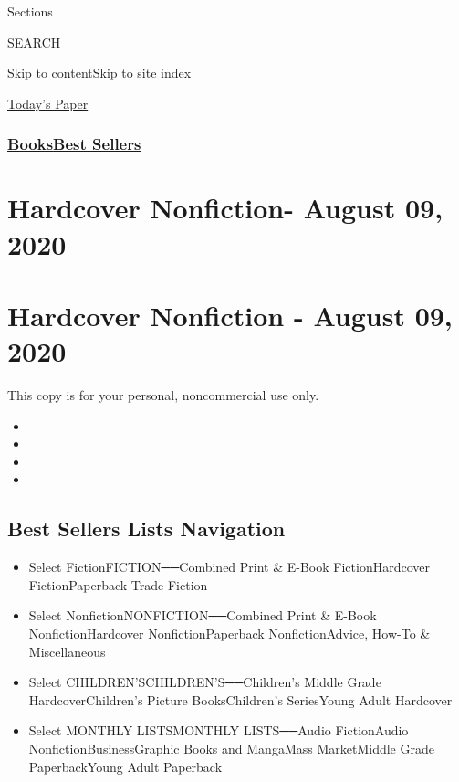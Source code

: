 Sections

SEARCH

\protect\hyperlink{site-content}{Skip to
content}\protect\hyperlink{site-index}{Skip to site index}

\href{https://myaccount.nytimes3xbfgragh.onion/auth/login?response_type=cookie\&client_id=vi}{}

\href{https://www.nytimes3xbfgragh.onion/section/todayspaper}{Today's
Paper}

\hypertarget{booksbest-sellers}{%
\subsubsection{\texorpdfstring{\href{/section/books/}{Books}\textbar{}\href{/books/best-sellers/}{Best
Sellers}}{Books\textbar{}Best Sellers}}\label{booksbest-sellers}}

\hypertarget{hardcover-nonfiction--august-09-2020}{%
\section{Hardcover Nonfiction- August 09,
2020}\label{hardcover-nonfiction--august-09-2020}}

\hypertarget{hardcover-nonfiction---august-09-2020}{%
\section{Hardcover Nonfiction - August 09,
2020}\label{hardcover-nonfiction---august-09-2020}}

This copy is for your personal, noncommercial use only.

\begin{itemize}
\item
\item
\item
\item
\end{itemize}

\hypertarget{best-sellers-lists-navigation}{%
\subsection{Best Sellers Lists
Navigation}\label{best-sellers-lists-navigation}}

\begin{itemize}
\tightlist
\item
  Select FictionFICTION──Combined Print \& E-Book FictionHardcover
  FictionPaperback Trade Fiction
\item
  Select NonfictionNONFICTION──Combined Print \& E-Book
  NonfictionHardcover NonfictionPaperback NonfictionAdvice, How-To \&
  Miscellaneous
\item
  Select CHILDREN'SCHILDREN'S──Children's Middle Grade
  HardcoverChildren's Picture BooksChildren's SeriesYoung Adult
  Hardcover
\item
  Select MONTHLY LISTSMONTHLY LISTS──Audio FictionAudio
  NonfictionBusinessGraphic Books and MangaMass MarketMiddle Grade
  PaperbackYoung Adult Paperback
\end{itemize}

